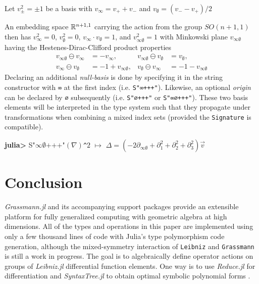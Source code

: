 \documentclass{juliacon}
\begin{document}
\begin{definition}
	Let $v_\pm^2 = \pm1$ be a basis with $v_\infty = v_++v_-$ and $v_\emptyset = (v_--v_+)/2$
\end{definition}
An embedding space $\mathbb{R}^{n+1,1}$ carrying the action from the group $SO(n+1,1)$ then has
$v_\infty^2 =0$, $v_\emptyset^2 =0$,
$v_\infty \cdot v_\emptyset = 1$,  and $v_{\infty\emptyset}^2 = 1$ with
Minkowski plane $v_{\infty\emptyset}$ having the Hestenes-Dirac-Clifford product properties
\begin{align*}
	v_{\infty\emptyset}\ominus v_\infty &= -v_\infty, &  v_{\infty\emptyset}\ominus v_\emptyset &= v_\emptyset, \\
	v_\infty\ominus v_\emptyset &= -1 + v_{\infty\emptyset}, & v_\emptyset\ominus v_\infty &=  -1 - v_{\infty\emptyset}
\end{align*}
Declaring an additional \textit{null-basis} is done by specifying it in the string constructor with \verb`∞` at the first index (i.e. \verb`S"∞+++"`). Likewise, an optional \textit{origin} can be declared by \verb`∅` subsequently (i.e. \verb`S"∅+++"` or \verb`S"∞∅+++"`). These two basis elements will be interpreted in the type system such that they propagate under transformations when combining a mixed index sets (provided the \verb`Signature` is compatible).
\begin{example}
	\textbf{julia>} S"$\infty\emptyset\text{+++"}(\nabla)$\verb`^`$2 \,\,  \mapsto\, \, \Delta = (-2\partial_{\infty\emptyset} + \partial_1^2 + \partial_2^2 + \partial_3^2)\vec v $
\end{example}

\section{Conclusion}

\textit{Grassmann.jl} and its accompanying support packages provide an extensible platform for fully generalized computing with geometric algebra at high dimensions.
All of the types and operations in this paper are implemented using only a few thousand lines of code with Julia's type polymorphism code generation, although the mixed-symmetry interaction of \verb`Leibniz` and \verb`Grassmann` is still a work in progress.
The goal is to algebraically define operator actions on groups of \textit{Leibniz.jl} differential function elements. 
One way is to use \textit{Reduce.jl} for differentiation and \textit{SyntaxTree.jl} to obtain optimal symbolic polynomial forms \cite{optim-poly}.
\end{document}
